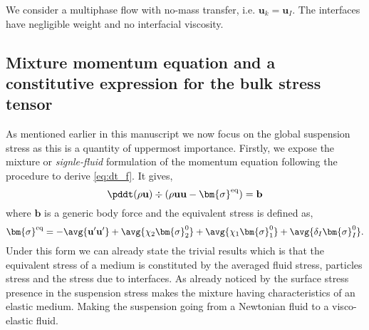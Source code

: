 
We consider a multiphase flow with no-mass transfer, i.e. $\textbf{u}_k=\textbf{u}_I$.
The interfaces have negligible weight and no interfacial viscosity. 

\subsection{Mixture momentum equation and a constitutive expression for the bulk stress tensor}

As mentioned earlier in this manuscript we  now focus on the global suspension stress as this is a quantity of uppermost importance. 
Firstly, we expose the mixture or \textit{signle-fluid} formulation of the momentum equation following the procedure to derive \ref{eq:dt_f}.
It gives, 
\begin{equation}
    \pddt (\rho \textbf{u})
    \div (\rho \textbf{uu} - \bm{\sigma}^\text{eq})
    = \textbf{b}
    \label{eq:dt_avg_rho_u}
\end{equation}
where $\textbf{b}$ is a generic body force and the equivalent stress is defined as, 
\begin{equation}
    \bm{\sigma}^\text{eq}
    = - \avg{\textbf{u}'\textbf{u}'}
    + \avg{\chi_2\bm{\sigma}_2^0}
    + \avg{\chi_1\bm{\sigma}_1^0}
    + \avg{\delta_I \bm{\sigma}_I^0}. 
    \label{eq:sigma_eq_def}
\end{equation}
Under this form we can already state the trivial results which is that the equivalent stress of a medium is constituted by the averaged fluid stress, particles stress and the stress due to interfaces. 
As already noticed by \citet{batchelor1970stress} the surface stress presence in the suspension stress makes the mixture having characteristics of an elastic medium. 
Making the suspension going from a Newtonian fluid to a visco-elastic fluid. 

